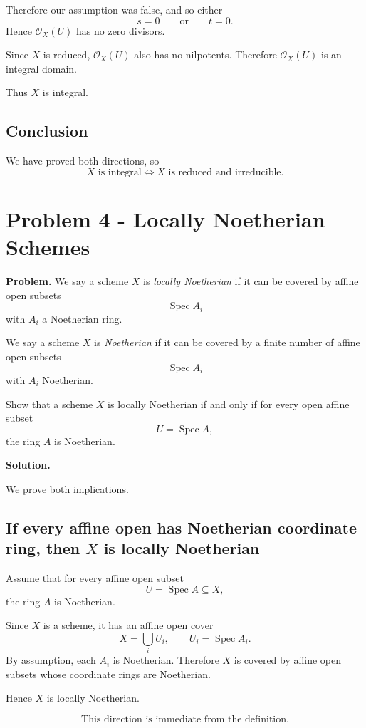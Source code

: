 \documentclass[12pt,a4paper]{article}
\DeclareMathOperator{\Spec}{Spec}
\providecommand{\Spec}{\operatorname{Spec}}
\theoremstyle{notespace}
\begin{document}
Therefore our assumption was false, and so either
\[
s=0
\qquad\text{or}\qquad
t=0.
\]
Hence \(\mathcal O_X(U)\) has no zero divisors.

Since \(X\) is reduced, \(\mathcal O_X(U)\) also has no nilpotents. Therefore \(\mathcal O_X(U)\) is an integral domain.

Thus \(X\) is integral.

\subsection*{Conclusion}

We have proved both directions, so
\[
\boxed{
	X\text{ is integral}
	\iff
	X\text{ is reduced and irreducible}.
}
\]


\section{Problem 4 - Locally Noetherian Schemes}

\textbf{Problem.}
We say a scheme \(X\) is \emph{locally Noetherian} if it can be covered by affine open subsets
\[
\Spec A_i
\]
with \(A_i\) a Noetherian ring.

We say a scheme \(X\) is \emph{Noetherian} if it can be covered by a finite number of affine open subsets
\[
\Spec A_i
\]
with \(A_i\) Noetherian.

Show that a scheme \(X\) is locally Noetherian if and only if for every open affine subset
\[
U=\Spec A,
\]
the ring \(A\) is Noetherian.

\textbf{Solution.}

We prove both implications.

\subsection*{If every affine open has Noetherian coordinate ring, then \(X\) is locally Noetherian}

Assume that for every affine open subset
\[
U=\Spec A\subseteq X,
\]
the ring \(A\) is Noetherian.

Since \(X\) is a scheme, it has an affine open cover
\[
X=\bigcup_i U_i,
\qquad
U_i=\Spec A_i.
\]
By assumption, each \(A_i\) is Noetherian. Therefore \(X\) is covered by affine open subsets whose coordinate rings are Noetherian.

Hence \(X\) is locally Noetherian.

\[
\boxed{
	\text{This direction is immediate from the definition.}
}
\]
\end{document}
